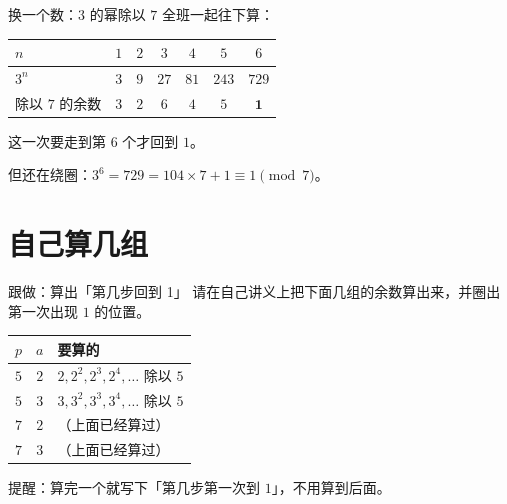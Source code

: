 \documentclass[10pt]{beamer}
\begin{document}
\begin{frame}{换一个数：\(3\) 的幂除以 \(7\)}
  全班一起往下算：
  \begin{center}
  \begin{tabular}{@{}lcccccc@{}}
    \toprule
    \(n\) & \(1\) & \(2\) & \(3\) & \(4\) & \(5\) & \(6\) \\
    \midrule
    \(3^n\) & \(3\) & \(9\) & \(27\) & \(81\) & \(243\) & \(729\) \\
    除以 \(7\) 的余数 & \(3\) & \(2\) & \(6\) & \(4\) & \(5\) & \(\mathbf{1}\) \\
    \bottomrule
  \end{tabular}
  \end{center}
  \pause
  \begin{center}
    {\large 这一次要走到第 \(6\) 个才回到 \(1\)。}
  \end{center}
  \pause
  \begin{center}
    {\large 但还在绕圈：\(3^6=729=104\times7+1\equiv1\pmod 7\)。}
  \end{center}
\end{frame}

\section{自己算几组}

\begin{frame}{跟做：算出「第几步回到 1」}
  请在自己讲义上把下面几组的余数算出来，并圈出第一次出现 \(1\) 的位置。
  \begin{center}
  \begin{tabular}{@{}ccl@{}}
    \toprule
    \(p\) & \(a\) & 要算的 \\
    \midrule
    \(5\) & \(2\) & \(2,2^2,2^3,2^4,\dots\) 除以 \(5\) \\
    \(5\) & \(3\) & \(3,3^2,3^3,3^4,\dots\) 除以 \(5\) \\
    \(7\) & \(2\) & （上面已经算过） \\
    \(7\) & \(3\) & （上面已经算过） \\
    \bottomrule
  \end{tabular}
  \end{center}
  \pause
  \begin{center}
    提醒：算完一个就写下「第几步第一次到 \(1\)」，不用算到后面。
  \end{center}
\end{frame}
\end{document}

